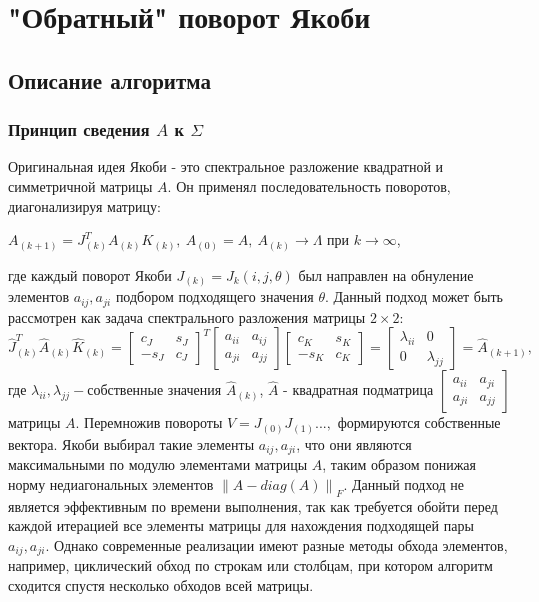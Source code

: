 \section{"Обратный" поворот Якоби}

\subsection{Описание алгоритма}

\subsubsection{Принцип сведения $A$ к $\Sigma$}

 Оригинальная идея Якоби - это спектральное разложение квадратной и симметричной матрицы $A$. Он применял последовательность поворотов, диагонализируя матрицу:
 \begin{center}
    $A_{(k+1)} = J^T_{(k)}A_{(k)}K_{(k)}, \ A_{(0)}= A, \ A_{(k)}\longrightarrow\Lambda \text{ при } k\to\infty$,
\end{center}
 где каждый поворот Якоби $J_{(k)} = J_{k}(i,j,\theta)$ был направлен на обнуление элементов $a_{ij}, a_{ji}$ подбором подходящего значения $\theta$. Данный подход может быть рассмотрен как задача спектрального разложения матрицы $2\times2$:
 \begin{equation} \label{original Jacobi}
    \hat{J}_{(k)}^T\hat{A}_{(k)}\hat{K}_{(k)} = \begin{bmatrix}
        c_J&s_J\\
        -s_J&c_J
    \end{bmatrix}^T
    \begin{bmatrix}
        a_{ii}&a_{ij}\\
        a_{ji}&a_{jj}
    \end{bmatrix}
    \begin{bmatrix}
        c_K&s_K\\
        -s_K&c_K
    \end{bmatrix} = \begin{bmatrix}
        \lambda_{ii} & 0\\
        0 & \lambda_{jj}
    \end{bmatrix} = \hat{A}_{(k+1)},
\end{equation}
где $\lambda_{ii}, \lambda_{jj} -\text{собственные значения } \hat{A}_{(k)}$, $\hat{A}$ - квадратная подматрица $\begin{bmatrix}
    a_{ii}&a_{ji}\\
    a_{ji}&a_{jj}
\end{bmatrix}$ матрицы $A$. Перемножив повороты $V = J_{(0)}J_{(1)}...,$ формируются собственные вектора.
Якоби выбирал такие элементы $a_{ij}, a_{ji}$, что они являются максимальными по модулю элементами матрицы $A$, таким образом понижая норму недиагональных элементов $\left\| A - diag(A) \right\|_F$. Данный подход не является эффективным по времени выполнения, так как требуется обойти перед каждой итерацией все элементы матрицы для нахождения подходящей пары $a_{ij}, a_{ji}$. Однако современные реализации имеют разные методы обхода элементов, например, циклический обход по строкам или столбцам, при котором алгоритм сходится спустя несколько обходов всей матрицы.

